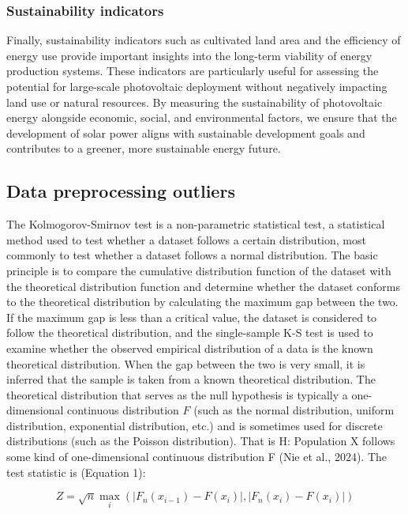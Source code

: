 \documentclass{article}
\begin{document}
	\subsubsection{Sustainability indicators}
	Finally, sustainability indicators such as cultivated land area and the efficiency of energy use provide important insights into the long-term viability of energy production systems. These indicators are particularly useful for assessing the potential for large-scale photovoltaic deployment without negatively impacting land use or natural resources. By measuring the sustainability of photovoltaic energy alongside economic, social, and environmental factors, we ensure that the development of solar power aligns with sustainable development goals and contributes to a greener, more sustainable energy future.
	
	\subsection{Data preprocessing outliers}
	The Kolmogorov-Smirnov test is a non-parametric statistical test, a statistical method used to test whether a dataset follows a certain distribution, most commonly to test whether a dataset follows a normal distribution. The basic principle is to compare the cumulative distribution function of the dataset with the theoretical distribution function and determine whether the dataset conforms to the theoretical distribution by calculating the maximum gap between the two. If the maximum gap is less than a critical value, the dataset is considered to follow the theoretical distribution, and the single-sample K-S test is used to examine whether the observed empirical distribution of a data is the known theoretical distribution. When the gap between the two is very small, it is inferred that the sample is taken from a known theoretical distribution. The theoretical distribution that serves as the null hypothesis is typically a one-dimensional continuous distribution $F$ (such as the normal distribution, uniform distribution, exponential distribution, etc.) and is sometimes used for discrete distributions (such as the Poisson distribution). That is H: Population X follows some kind of one-dimensional continuous distribution F (Nie et al., 2024). The test statistic is (Equation 1):
	
	\begin{equation}
		Z=\sqrt{n}\max_{i}(|F_{n}(x_{i-1})-F(x_{i})|,|F_{n}(x_{i})-F(x_{i})|)
	\end{equation}
	
\end{document}
